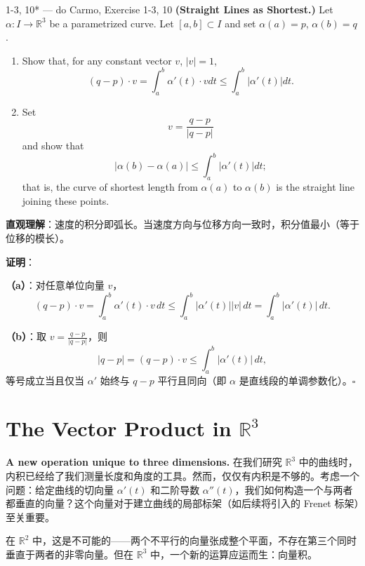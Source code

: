 \begin{exercise}{1-3, 10* — do Carmo, Exercise 1-3, 10}
\textbf{(Straight Lines as Shortest.)} Let $\alpha: I \to \mathbb{R}^3$ be a parametrized curve. Let $[a, b] \subset I$ and set $\alpha(a) = p$, $\alpha(b) = q$.
\begin{enumerate}
\item[a.] Show that, for any constant vector $v$, $|v| = 1$,
\[
(q - p) \cdot v = \int_a^b \alpha'(t) \cdot v dt \leq \int_a^b |\alpha'(t)| dt.
\]
\item[b.] Set
\[
v = \frac{q - p}{|q - p|}
\]
and show that
\[
|\alpha(b) - \alpha(a)| \leq \int_a^b |\alpha'(t)| dt;
\]
that is, the curve of shortest length from $\alpha(a)$ to $\alpha(b)$ is the straight line joining these points.
\end{enumerate}
\end{exercise}

\begin{solution}
\textbf{直观理解}：速度的积分即弧长。当速度方向与位移方向一致时，积分值最小（等于位移的模长）。

\textbf{证明}：

\textbf{（a）}：对任意单位向量 $v$，
\[
(q - p) \cdot v = \int_a^b \alpha'(t) \cdot v\, dt \leq \int_a^b |\alpha'(t)||v|\, dt = \int_a^b |\alpha'(t)|\, dt.
\]

\textbf{（b）}：取 $v = \frac{q-p}{|q-p|}$，则
\[
|q-p| = (q-p) \cdot v \leq \int_a^b |\alpha'(t)|\, dt,
\]
等号成立当且仅当 $\alpha'$ 始终与 $q-p$ 平行且同向（即 $\alpha$ 是直线段的单调参数化）。$\square$
\end{solution}

\section{The Vector Product in $\mathbb{R}^3$}\label{sec:vector-product-ch1}

\textbf{A new operation unique to three dimensions.} 在我们研究 $\mathbb{R}^3$ 中的曲线时，内积已经给了我们测量长度和角度的工具。然而，仅仅有内积是不够的。考虑一个问题：给定曲线的切向量 $\alpha'(t)$ 和二阶导数 $\alpha''(t)$，我们如何构造一个与两者都垂直的向量？这个向量对于建立曲线的局部标架（如后续将引入的 Frenet 标架）至关重要。

在 $\mathbb{R}^2$ 中，这是不可能的——两个不平行的向量张成整个平面，不存在第三个同时垂直于两者的非零向量。但在 $\mathbb{R}^3$ 中，一个新的运算应运而生：向量积。

